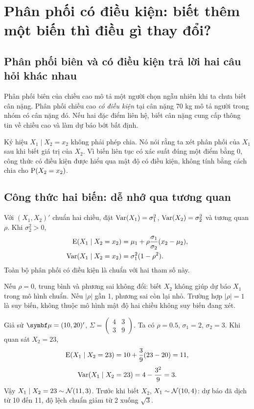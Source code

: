 \clearpage
\section{Phân phối có điều kiện: biết thêm một biến thì điều gì thay đổi?}
\label{sec:conditional}

\subsection{Phân phối biên và có điều kiện trả lời hai câu hỏi khác nhau}
Phân phối biên của chiều cao mô tả một người chọn ngẫu nhiên khi ta chưa
biết cân nặng. Phân phối chiều cao \emph{có điều kiện} tại cân nặng 70 kg
mô tả người trong nhóm có cân nặng đó. Nếu hai đặc điểm liên hệ, biết cân
nặng cung cấp thông tin về chiều cao và làm dự báo bớt bất định.

Ký hiệu $X_1\mid X_2=x_2$ không phải phép chia. Nó nói rằng ta xét phân
phối của $X_1$ sau khi biết giá trị của $X_2$. Vì biến liên tục có xác suất
đúng một điểm bằng 0, công thức có điều kiện được hiểu qua mật độ có điều
kiện, không tính bằng cách chia cho $\operatorname{P}(X_2=x_2)$.

\subsection{Công thức hai biến: dễ nhớ qua tương quan}
Với $(X_1,X_2)'$ chuẩn hai chiều, đặt
$\operatorname{Var}(X_1)=\sigma_1^2$, $\operatorname{Var}(X_2)=\sigma_2^2$ và tương quan $\rho$.
Khi $\sigma_2^2>0$,
\begin{align}
 \operatorname{E}(X_1\mid X_2=x_2)
 &=\mu_1+\rho\frac{\sigma_1}{\sigma_2}(x_2-\mu_2),
 \label{eq:cond2mean}\\
 \operatorname{Var}(X_1\mid X_2=x_2)&=\sigma_1^2(1-\rho^2).
 \label{eq:cond2var}
\end{align}
Toàn bộ phân phối có điều kiện là chuẩn với hai tham số này.


Nếu $\rho=0$, trung bình và phương sai không đổi: biết $X_2$ không giúp
dự báo $X_1$ trong mô hình chuẩn. Nếu $|\rho|$ gần 1, phương sai còn lại
nhỏ. Trường hợp $|\rho|=1$ là suy biến, không thuộc mô hình mật độ hai chiều
không suy biến đang xét.

\begin{example}
Giả sử $\vmu=(10,20)'$, $\Sigma=\begin{pmatrix}4&3\\3&9\end{pmatrix}$.
Ta có $\rho=0.5$, $\sigma_1=2$, $\sigma_2=3$.
Khi quan sát $X_2=23$,
\[
 \operatorname{E}(X_1\mid X_2=23)=10+\frac39(23-20)=11,
\]
\[
 \operatorname{Var}(X_1\mid X_2=23)=4-\frac{3^2}{9}=3.
\]
Vậy $X_1\mid X_2=23\sim\mathcal N(11,3)$.
Trước khi biết $X_2$, $X_1\sim\mathcal N(10,4)$: dự báo đã dịch từ 10 đến 11,
độ lệch chuẩn giảm từ 2 xuống $\sqrt3$.
\end{example}

